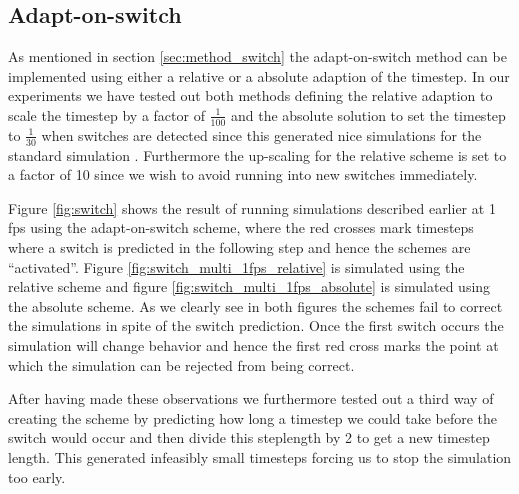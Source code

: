 \documentclass[11pt]{article}
\begin{document}

\subsection{Adapt-on-switch}
As mentioned in section \ref{sec:method_switch} the adapt-on-switch method
can be implemented using either a relative or a absolute adaption of the
timestep. In our experiments we have tested out both methods defining the
relative adaption to scale the timestep by a factor of $\frac{1}{100}$ and
the absolute solution to set the timestep to $\frac{1}{30}$ when switches are
detected since this generated nice simulations for the standard simulation .
Furthermore the up-scaling for the relative scheme is set to a factor of 10
since we wish to avoid running into new switches immediately.

Figure \ref{fig:switch} shows the result of running simulations
described earlier at 1 fps using the adapt-on-switch scheme, where
the red crosses mark timesteps where a switch is predicted in the
following step and hence the schemes are ``activated''. Figure
\ref{fig:switch_multi_1fps_relative} is simulated using the relative scheme
and figure \ref{fig:switch_multi_1fps_absolute} is simulated using the
absolute scheme. As we clearly see in both figures the schemes fail to correct
the simulations in spite of the switch prediction. Once the first switch
occurs the simulation will change behavior and hence the first red cross marks
the point at which the simulation can be rejected from being correct.

After having made these observations we furthermore tested out a third way of
creating the scheme by predicting how long a timestep we could take before the
switch would occur and then divide this steplength by 2 to get a new timestep
length. This generated infeasibly small timesteps forcing us to stop the
simulation too early.
\end{document}
